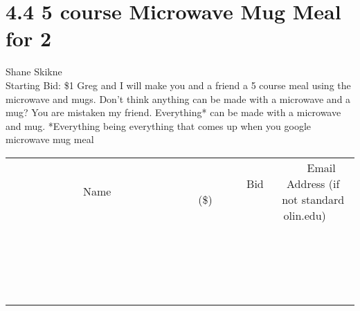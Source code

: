 \documentclass[11pt]{article}
\begin{document}
\section*{4.4 5 course Microwave Mug Meal for 2}
Shane Skikne
\\
Starting Bid: \$1
\newline
Greg and I will make you and a friend a 5 course meal using the microwave and mugs. Don't think anything can be made with a microwave and a mug? You are mistaken my friend. Everything* can be made with a microwave and mug.  
*Everything being everything that comes up when you google microwave mug meal
\\[3ex]
\begin{tabular}{c c c}
~~~~~~~~~~~~~Name~~~~~~~~~~~~~ & ~~~~~~~~~Bid (\$)~~~~~~~~~  & ~~~Email Address (if not standard olin.edu)~~~\\
 & & \\
\hline
 & & \\
\hline
 & & \\
\hline
 & & \\
\hline
 & & \\
\hline
 & & \\
\hline
 & & \\
\hline
 & & \\
\hline
 & & \\
\hline
 & & \\
\hline
 & & \\
\hline
 & & \\
\hline
 & & \\
\hline
 & & \\
\hline
 & & \\
\hline
 & & \\
\hline
 & & \\
\hline
 & & \\
\hline
 & & \\
\hline
\end{tabular}
\newpage
\end{document}
